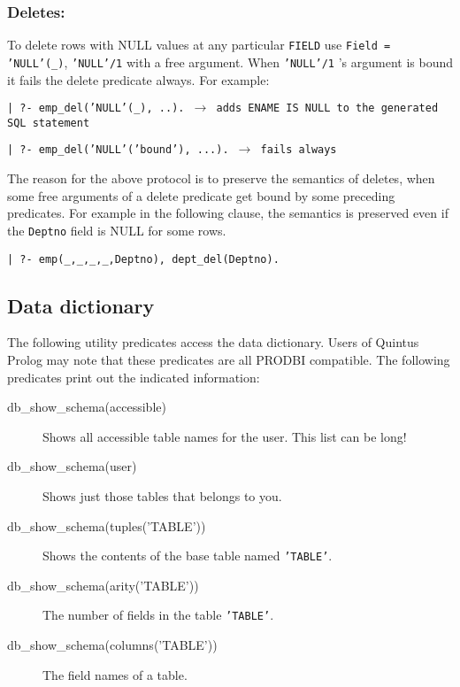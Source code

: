 \subsubsection{Deletes:}


To delete rows with NULL values at any particular {\tt FIELD} use {\tt Field = 'NULL'(\_)}, {\tt 'NULL'/1} with a free argument.  When {\tt 'NULL'/1} 's argument
is bound it fails the delete predicate always.  For example:

\begin{center}
{\tt | ?- emp\_del('NULL'(\_), ..).  $\rightarrow$ adds ENAME IS NULL to the generated SQL statement}
\end{center}
\begin{center}

{\tt | ?- emp\_del('NULL'('bound'), ...).  $\rightarrow$ fails always}

\end{center}

The reason for the above protocol is to preserve the semantics of deletes, 
when some free arguments of a delete predicate get bound by some preceding
predicates.  For example in the following clause, the semantics is preserved 
even if the {\tt Deptno} field is NULL for some rows.


\begin{center}

{\tt | ?- emp(\_,\_,\_,\_,Deptno), dept\_del(Deptno).}
\end{center}




\subsection{Data dictionary}


The following utility predicates access the data dictionary.  Users of
Quintus Prolog may note that these predicates are all PRODBI
compatible.  The following predicates print out the indicated information:
\begin{description}

\item[db\_show\_schema(accessible)]
	 Shows all accessible table names for the user.  This list can be long!

\item[db\_show\_schema(user)]
	Shows just those tables that belongs to you.

\item[db\_show\_schema(tuples('TABLE'))]
	Shows the contents of the base table named {\tt 'TABLE'}.

\item[db\_show\_schema(arity('TABLE'))]
	The number of fields in the table {\tt 'TABLE'}.

\item[db\_show\_schema(columns('TABLE'))]
	The field names of a table.
\end{description}

